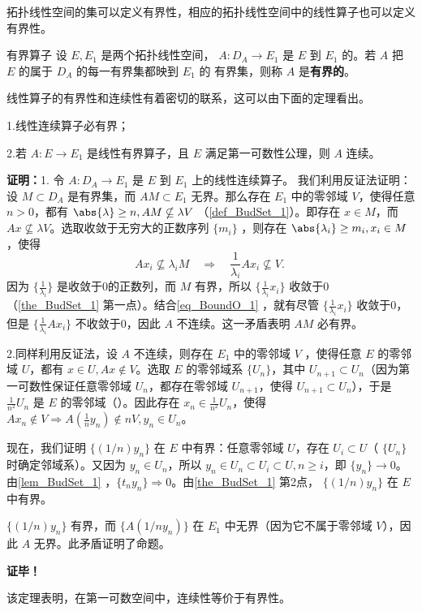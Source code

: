 

\cite{Ke1}拓扑线性空间的集可以定义有界性，相应的拓扑线性空间中的线性算子也可以定义有界性。

\begin{definition}{有界算子}
设 $E,E_1$ 是两个拓扑线性空间， $A:D_A\rightarrow E_1$ 是 $E$ 到 $E_1$ 的。若 $A$ 把 $E$ 的属于 $D_A$ 的每一有界集都映到 $E_1$ 的 有界集，则称 $A$ 是\textbf{有界的}。
\end{definition}

线性算子的有界性和连续性有着密切的联系，这可以由下面的定理看出。

\begin{theorem}{}\label{the_BoundO_1}
1.线性连续算子必有界；

2.若 $A:E\rightarrow E_1$ 是线性有界算子，且 $E$ 满足第一可数性公理，则 $A$ 连续。
\end{theorem}
\textbf{证明：}1. 令 $A:D_A\rightarrow E_1$ 是 $E$ 到 $E_1$ 上的线性连续算子。 我们利用反证法证明：设 $M\subset D_A$ 是有界集，而 $AM\subset E_1$ 无界。那么存在 $E_1$ 中的零邻域 $V$，使得任意 $n>0$，都有 $\abs{\lambda}\geq n,AM\nsubseteq\lambda V$ （\autoref{def_BudSet_1}）。即存在 $x\in M$，而 $Ax\nsubseteq \lambda V$。选取收敛于无穷大的正数序列 $\{m_i\}$ ，则存在 $\abs{\lambda_i}\geq m_i,x_i\in M$，使得 
\begin{equation}\label{eq_BoundO_1}
Ax_i\nsubseteq \lambda_iM\quad\Rightarrow\quad \frac{1}{\lambda_i}A x_i\nsubseteq V. ~
\end{equation}
因为 $\{\frac{1}{\lambda_i}\}$ 是收敛于0的正数列，而 $M$ 有界，所以 $\{\frac{1}{\lambda_i}x_i\}$ 收敛于0（\autoref{the_BudSet_1} 第一点）。结合\autoref{eq_BoundO_1} ，就有尽管 $\{\frac{1}{\lambda_i}x_i\}$ 收敛于0，但是 $\{\frac{1}{\lambda_i}A x_i\}$ 不收敛于0，因此 $A$ 不连续。这一矛盾表明 $AM$ 必有界。

2.同样利用反证法，设 $A$ 不连续，则存在 $E_1$ 中的零邻域 $V$ ，使得任意 $E$ 的零邻域 $U$，都有 $x\in U,Ax\notin V$。选取 $E$ 的零邻域系 $\{U_n\}$，其中 $U_{n+1}\subset U_n$（因为第一可数性保证任意零邻域 $U_n$，都存在零邻域 $U_{n+1}$，使得 $U_{n+1}\subset U_n$），于是 $\frac{1}{n^2} U_n$ 是 $E$ 的零邻域（）。因此存在 $x_n\in \frac{1}{n^2}U_n$，使得 $Ax_n\notin V\Rightarrow A (\frac{1}{n}y_n)\notin n V,y_n\in U_n$。

现在，我们证明 $\{(1/n) y_n\}$ 在 $E$ 中有界：任意零邻域 $U$，存在 $U_i\subset U$（ $\{U_n\}$  时确定邻域系）。又因为 $y_n\in U_n$，所以 $y_n\in U_n\subset U_i\subset U,n\geq i$，即 $\{y_n\}\rightarrow 0$。由\autoref{lem_BudSet_1} ，$\{t_ny_n\}\Rightarrow0$。由\autoref{the_BudSet_1} 第2点， $\{(1/n) y_n\}$ 在 $E$ 中有界。

$\{(1/n) y_n\}$ 有界，而 $\{A(1/n y_n)\}$ 在 $E_1$ 中无界（因为它不属于零邻域 $V$），因此 $A$ 无界。此矛盾证明了命题。

 
\textbf{证毕！}

该定理表明，在第一可数空间中，连续性等价于有界性。

